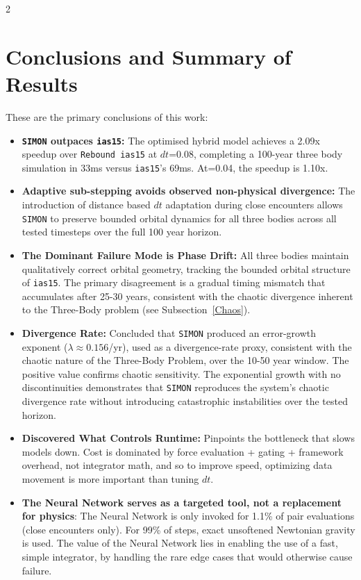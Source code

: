 \documentclass{article}
\begin{document}
\begin{multicols}{2}
\section{Conclusions and Summary of Results}
These are the primary conclusions of this work:
\begin{itemize}
    \item \textbf{\texttt{SIMON} outpaces \texttt{ias15}:} The optimised hybrid model achieves a 2.09x speedup over \texttt{Rebound ias15} at $dt$=0.08, completing a 100-year three body simulation in 33ms versus \texttt{ias15}'s 69ms. At=0.04, the speedup is 1.10x.
    \item \textbf{Adaptive sub-stepping avoids observed non-physical divergence:} The introduction of distance based $dt$ adaptation during close encounters allows \texttt{SIMON} to preserve bounded orbital dynamics for all three bodies across all tested timesteps over the full 100 year horizon.
    \item \textbf{The Dominant Failure Mode is Phase Drift:} All three bodies maintain qualitatively correct orbital geometry, tracking the bounded orbital structure of \texttt{ias15}. The primary disagreement is a gradual timing mismatch that accumulates after 25-30 years, consistent with the chaotic divergence inherent to the Three-Body problem (see Subsection~\ref{Chaos}).
    \item \textbf{Divergence Rate:} Concluded that \texttt{SIMON} produced an error-growth exponent ($\lambda\approx0.156$/yr), used as a divergence-rate proxy, consistent with the chaotic nature of the Three-Body Problem, over the 10-50 year window. The positive value confirms chaotic sensitivity. The exponential growth with no discontinuities demonstrates that \texttt{SIMON} reproduces the system's chaotic divergence rate without introducing catastrophic instabilities over the tested horizon.
    \item \textbf{Discovered What Controls Runtime:} Pinpoints the bottleneck that slows models down. Cost is dominated by force evaluation + gating + framework overhead, not integrator math, and so to improve speed, optimizing data movement is more important than tuning $dt$.
    \item \textbf{The Neural Network serves as a targeted tool, not a replacement for physics}: The Neural Network is only invoked for 1.1\% of pair evaluations (close encounters only). For 99\% of steps, exact unsoftened Newtonian gravity is used. The value of the Neural Network lies in enabling the use of a fast, simple integrator, by handling the rare edge cases that would otherwise cause failure.

\end{itemize}
\end{multicols}
\end{document}
